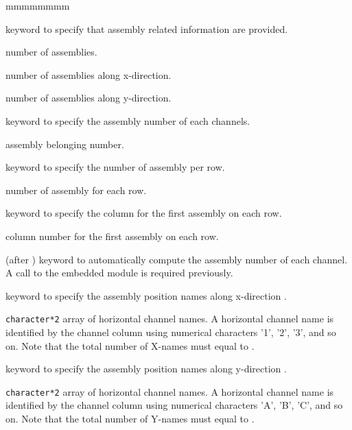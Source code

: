 \begin{ListeDeDescription}{mmmmmmmm}
\item[\moc{ASSEMBLY}] keyword to specify that assembly related information are provided.

\item[\dusa{na}] number of assemblies. 

\item[\dusa{nax}] number of assemblies along x-direction. 

\item[\dusa{nay}] number of assemblies along y-direction.

\item[\moc{A-ZONE}] keyword to specify the assembly number  of each channels. 

\item[\dusa{iza}] assembly belonging number. 

\item[\moc{A-NX}] keyword to specify the number of assembly  per row. 

\item[\dusa{nbax}] number of assembly for each row. 

\item[\moc{A-IBX}] keyword to specify the column for the first assembly  on each row. 

\item[\dusa{ibax}] column number for the first assembly on each row. 

\item[\moc{ASBLY}] (after ) keyword to automatically compute the assembly number of each channel. A call to the embedded module   is required previously.

\item[\moc{AXNAME}] keyword to specify the assembly position names along x-direction .

\item[\dusa{XNAMEA}] \texttt{character*2} array of horizontal channel
names. A horizontal channel name is identified by the channel column
using numerical characters '1', '2', '3', and so on.
Note that the total number of X-names must equal to . 

\item[\moc{AYNAME}] keyword to specify the assembly position names along y-direction .

\item[\dusa{YNAMEA}]  \texttt{character*2} array of horizontal channel
names. A horizontal channel name is identified by the channel column
using numerical characters 'A', 'B', 'C', and so on.
Note that the total number of Y-names must equal to .  


\end{ListeDeDescription}
